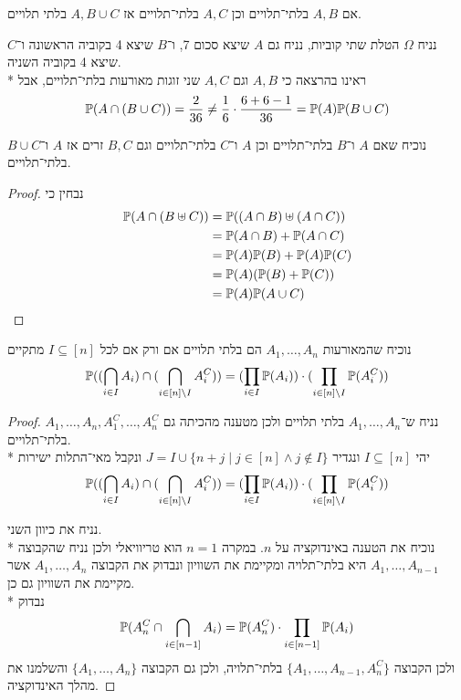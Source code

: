 \Subquestion{}
אם $A, B$ בלתי־תלויים וכן $A, C$ בלתי־תלויים אז $A, B \cup C$ בלתי תלויים.
\begin{solution}
	נניח $\Omega$ הטלת שתי קוביות, נניח גם $A$ שיצא סכום 7, ו־$B$ שיצא 4 בקוביה הראשונה ו־$C$ שיצא 4 בקוביה השניה. \\*
	ראינו בהרצאה כי $A, B$ וגם $A, C$ שני זוגות מאורעות בלתי־תלויים, אבל
	\[
		\mathbb{P}(A \cap (B \cup C)) = \frac{2}{36} \ne \frac{1}{6} \cdot \frac{6 + 6 - 1}{36} = \mathbb{P}(A) \mathbb{P}(B \cup C)
	\]
\end{solution}

\Subquestion{}
נוכיח שאם $A$ ו־$B$ בלתי־תלויים וכן $A$ ו־$C$ בלתי־תלויים וגם $B, C$ זרים אז $A$ ו־$B \cup C$ בלתי־תלויים.
\begin{proof}
	נבחין כי
	\begin{align*}
		\mathbb{P}(A \cap (B \uplus C))
		& = \mathbb{P}((A \cap B) \uplus (A \cap C)) \\
		& = \mathbb{P}(A \cap B) + \mathbb{P}(A \cap C) \\
		& = \mathbb{P}(A) \mathbb{P}(B) + \mathbb{P}(A) \mathbb{P}(C) \\
		& = \mathbb{P}(A)(\mathbb{P}(B) + \mathbb{P}(C)) \\
		& = \mathbb{P}(A) \mathbb{P}(A \cup C)
	\end{align*}
\end{proof}

\Question{}
נוכיח שהמאורעות $A_1, \dots, A_n$ הם בלתי תלויים אם ורק אם לכל $I \subseteq [n]$ מתקיים
\[
	\mathbb{P}( (\bigcap_{i \in I} A_i) \cap (\bigcap_{i \in [n] \setminus I} A_i^C))
	= (\prod_{i \in I} \mathbb{P}(A_i)) \cdot (\prod_{i \in [n] \setminus I} \mathbb{P}(A_i^C))
\]
\begin{proof}
	נניח ש־$A_1, \dots, A_n$ בלתי תלויים ולכן מטענה מהכיתה גם $A_1, \dots, A_n, A_1^C, \dots, A_n^C$ בלתי־תלויים. \\*
	יהי $I \subseteq [n]$ ונגדיר $J = I \cup \{ n + j \mid j \in [n] \land j \notin I \}$ ונקבל מאי־התלות ישירות
	\[
		\mathbb{P}( (\bigcap_{i \in I} A_i) \cap (\bigcap_{i \in [n] \setminus I} A_i^C))
		= (\prod_{i \in I} \mathbb{P}(A_i)) \cdot (\prod_{i \in [n] \setminus I} \mathbb{P}(A_i^C))
	\]

	נניח את כיוון השני. \\*
	נוכיח את הטענה באינדוקציה על $n$. במקרה $n = 1$ הוא טריוויאלי ולכן נניח שהקבוצה $A_1, \dots, A_{n - 1}$ היא בלתי־תלויה ומקיימת את השוויון ונבדוק את הקבוצה $A_1, \dots, A_n$ אשר מקיימת את השוויון גם כן. \\*
	נבדוק
	\[
		\mathbb{P}(A_n^C \cap \bigcap_{i \in [n - 1]} A_i)
		= \mathbb{P}(A_n^C) \cdot \prod_{i \in [n - 1]} \mathbb{P}(A_i)
	\]
	ולכן הקבוצה $\{A_1, \dots, A_{n - 1}, A_n^C\}$ בלתי־תלויה, ולכן גם הקבוצה $\{A_1, \dots, A_n\}$ והשלמנו את מהלך האינדוקציה.
\end{proof}

